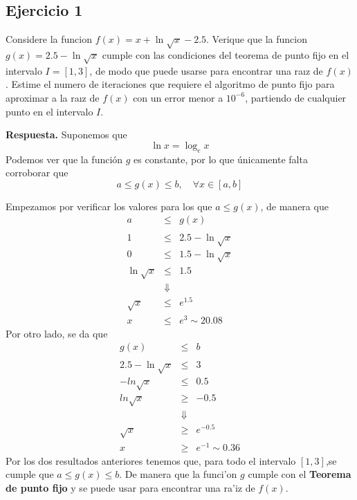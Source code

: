 \documentclass[11pt]{article}
\begin{document}
\newpage
    \hypertarget{ejercicio-1}{%
\subsection{Ejercicio 1}\label{ejercicio-1}}

		Considere la funcion $f(x) = x + \ln\sqrt{x} - 2.5$. Verique que la
	funcion \(g(x) = 2.5 - \ln\sqrt x\) cumple con las condiciones del
	teorema de punto fijo en el intervalo \(I = [1, 3]\), de modo que puede
	usarse para encontrar una raız de \(f(x)\). Estime el numero de
	iteraciones que requiere el algoritmo de punto fijo para aproximar a la
	raız de \(f(x)\) con un error menor a \(10^{-6}\), partiendo de
	cualquier punto en el intervalo \(I\).
	
\begin{multicols}{2}
		\textbf{Respuesta.} Suponemos que $$\ln x = \log_e x$$ Podemos ver que
	la funci\'on \(g\) es constante, por lo que \'unicamente falta corroborar
	que
	\begin{equation*} a \leq g(x) \leq b,\quad \forall x \in [a,b] \end{equation*}

	Empezamos por verificar los valores para los que \(a \leq g(x)\), de
	manera que \begin{eqnarray*}
		a &\leq& g(x) \\ && \\
		1 &\leq& 2.5- \ln\sqrt x \\
		0 &\leq& 1.5- \ln\sqrt x \\
		\ln\sqrt x &\leq& 1.5 \\
		&\Downarrow& \\
		\sqrt x &\leq& e^{1.5} \\
		x &\leq& e^3 \sim 20.08
	\end{eqnarray*} Por otro lado, se da que \begin{eqnarray*}
		g(x) &\leq& b \\ && \\
		2.5- \ln\sqrt x &\leq& 3 \\
		-ln\sqrt x &\leq& 0.5 \\
		ln\sqrt x &\geq& -0.5 \\
		&\Downarrow& \\
		\sqrt x &\geq& e^{-0.5} \\
		x &\geq& e^{-1} \sim 0.36
	\end{eqnarray*} Por los dos resultados anteriores tenemos que, para todo
	el intervalo \([1,3]\),se cumple que \(a \leq g(x) \leq b\). De manera
	que la funci'on \(g\) cumple con el \textbf{Teorema de punto fijo} y se
	puede usar para encontrar una ra'iz de \(f(x)\).
\end{multicols}
\end{document}
